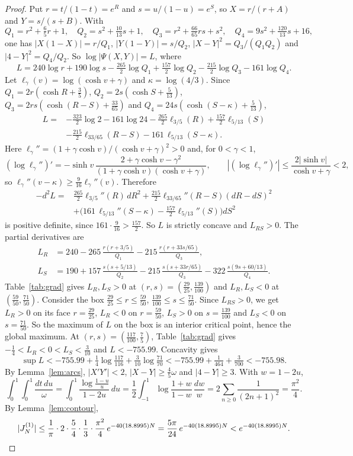 \documentclass{amsart}
\numberwithin{equation}{section}
\numberwithin{table}{section}
\begin{document}
\begin{proof}
Put $r=t/(1-t)=e^R$ and $s=u/(1-u)=e^S$, so $X=r/(r+A)$ and $Y=s/(s+B)$.
With
\[
Q_1=r^2+\tfrac65r+1,\quad Q_2=s^2+\tfrac{10}{13}s+1,\quad
Q_3=r^2+\tfrac{66}{65}rs+s^2,\quad Q_4=9s^2+\tfrac{120}{13}s+16,
\]
one has $|X(1-X)|=r/Q_1$, $|Y(1-Y)|=s/Q_2$, $|X-Y|^2=Q_3/(Q_1Q_2)$ and
$|4-Y|^2=Q_4/Q_2$. So $\log|\Psi(X,Y)|=L$, where
\[
L=240\log r+190\log s-\tfrac{265}2\log Q_1+\tfrac{157}2\log Q_2
-\tfrac{215}2\log Q_3-161\log Q_4 .
\]
Let $\ell_\gamma(v)=\log(\cosh v+\gamma)$ and $\kappa=\log(4/3)$. Since
$Q_1=2r(\cosh R+\frac35)$, $Q_2=2s(\cosh S+\frac5{13})$,
$Q_3=2rs(\cosh(R-S)+\frac{33}{65})$ and $Q_4=24s(\cosh(S-\kappa)+\frac5{13})$,
\begin{align*}
L={}&-\tfrac{323}2\log2-161\log24-\tfrac{265}2\ell_{3/5}(R)+\tfrac{157}2\ell_{5/13}(S)\\
&-\tfrac{215}2\ell_{33/65}(R-S)-161\,\ell_{5/13}(S-\kappa).
\end{align*}
Here $\ell_\gamma''=(1+\gamma\cosh v)/(\cosh v+\gamma)^2>0$ and, for
$0<\gamma<1$,
\[
(\log\ell_\gamma'')'=-\sinh v\,\frac{2+\gamma\cosh v-\gamma^2}{(1+\gamma\cosh v)(\cosh v+\gamma)},
\qquad
|(\log\ell_\gamma'')'|\le\frac{2|\sinh v|}{\cosh v+\gamma}<2,
\]
so $\ell_\gamma''(v-\kappa)\ge\frac9{16}\ell_\gamma''(v)$. Therefore
\begin{align*}
-d^2L={}&\tfrac{265}2\ell_{3/5}''(R)\,dR^2+\tfrac{215}2\ell_{33/65}''(R-S)(dR-dS)^2\\
&+\bigl(161\,\ell_{5/13}''(S-\kappa)-\tfrac{157}2\ell_{5/13}''(S)\bigr)dS^2
\end{align*}
is positive definite, since $161\cdot\frac9{16}>\frac{157}2$. So $L$ is
strictly concave and $L_{RS}>0$. The partial derivatives are
\begin{align*}
L_R&=240-265\,\frac{r(r+3/5)}{Q_1}-215\,\frac{r(r+33s/65)}{Q_3},\\
L_S&=190+157\,\frac{s(s+5/13)}{Q_2}-215\,\frac{s(s+33r/65)}{Q_3}-322\,\frac{s(9s+60/13)}{Q_4} .
\end{align*}
Table~\ref{tab:grad} gives $L_R,L_S>0$ at $(r,s)=(\frac{29}{25},\frac{139}{100})$
and $L_R,L_S<0$ at $(\frac{59}{50},\frac{71}{50})$. Consider the box
$\frac{29}{25}\le r\le\frac{59}{50}$, $\frac{139}{100}\le s\le\frac{71}{50}$.
Since $L_{RS}>0$, we get $L_R>0$ on its face $r=\frac{29}{25}$, $L_R<0$ on
$r=\frac{59}{50}$, $L_S>0$ on $s=\frac{139}{100}$ and $L_S<0$ on
$s=\frac{71}{50}$.
So the maximum of $L$ on the box is an interior critical point, hence the
global maximum. At $(r,s)=(\frac{117}{100},\frac75)$,
Table~\ref{tab:grad} gives $-\frac14<L_R<0<L_S<\frac3{10}$ and $L<-755.99$.
Concavity gives
\[
\sup L<-755.99+\tfrac14\log\tfrac{117}{116}+\tfrac3{10}\log\tfrac{71}{70}
<-755.99+\tfrac1{464}+\tfrac3{700}<-755.98 .
\]
By Lemma~\ref{lem:arcs}, $|X'Y'|<2$, $|X-Y|\ge\frac45\omega$ and $|4-Y|\ge3$.
With $w=1-2u$,
\[
\int_0^1\!\!\int_0^1\frac{dt\,du}{\omega}=\int_0^1\frac{\log\frac{1-u}{u}}{1-2u}\,du
=\frac12\int_{-1}^1\log\frac{1+w}{1-w}\,\frac{dw}{w}
=2\sum_{n\ge0}\frac1{(2n+1)^2}=\frac{\pi^2}4 .
\]
By Lemma~\ref{lem:contour},
\[
|J_N^{(1)}|\le\frac1\pi\cdot2\cdot\frac54\cdot\frac13\cdot\frac{\pi^2}4\,e^{-40(18.8995)N}
=\frac{5\pi}{24}\,e^{-40(18.8995)N}<e^{-40(18.8995)N}.\qedhere
\]
\end{proof}
\end{document}
